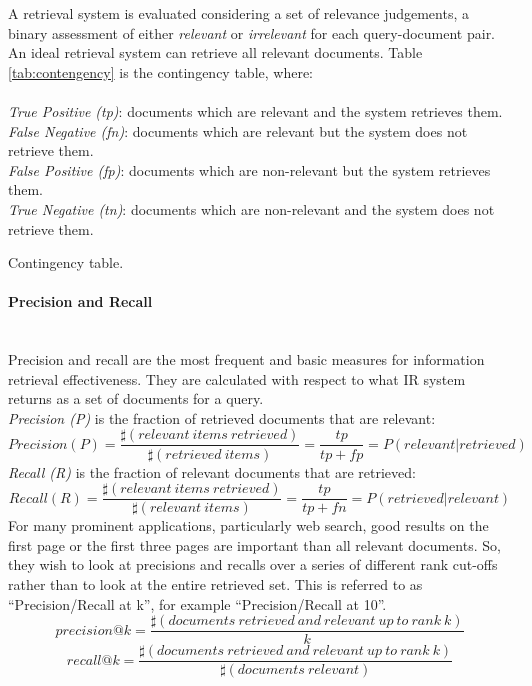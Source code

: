 A retrieval system is evaluated considering a set of relevance judgements, a binary assessment of either \textit{relevant} or \textit{irrelevant} for each query-document pair. An ideal retrieval system can retrieve all relevant documents. Table \ref{tab:contengency} is the contingency table, where:\\\\
\textit{True Positive (tp)}: documents which are relevant and the system retrieves them.\\
\textit{False Negative (fn)}: documents which are relevant but the system does not retrieve them. \\
\textit{False Positive (fp)}: documents which are non-relevant but the system retrieves them.\\
\textit{True Negative (tn)}: documents which are non-relevant and the system does not retrieve them. 
\begin{table*}[htpb]
  \centering
  
  \caption{Contingency table.}
  \label{tab:contengency}
\end{table*}
\FloatBarrier 
\paragraph{Precision and Recall}
\ \\
Precision and recall are the most frequent and basic measures for information retrieval effectiveness. They are calculated with respect to what IR system returns as a set of documents for a query.\\
\textit{Precision (P)} is the fraction of retrieved documents that are relevant:
\[
Precision (P)=\frac{\sharp(relevant \: items \: retrieved)}{\sharp(retrieved \: items)}=\frac{tp}{tp+fp}=P(relevant|retrieved)
\]
\textit{Recall (R)} is the fraction of relevant documents that are retrieved:
\[
Recall (R)=\frac{\sharp(relevant \: items \: retrieved)}{\sharp(relevant \: items)}=\frac{tp}{tp+fn}=P(retrieved|relevant)
\]
For many prominent applications, particularly web search, good results on the first page or the first three pages are important than all relevant documents. So, they wish to look at precisions and recalls over a series of different rank cut-offs rather than to look at the entire retrieved set. This is referred to as “Precision/Recall at k”, for example “Precision/Recall at 10”. 
\begin{equation}
precision@k=\frac{\sharp(documents \: retrieved \: and \: relevant \: up \: to \: rank \: k)}{k}
\end{equation}
\begin{equation}
recall@k=\frac{\sharp(documents \: retrieved \: and \: relevant \: up \: to \: rank \: k)}{\sharp(documents \: relevant)}
\end{equation}
